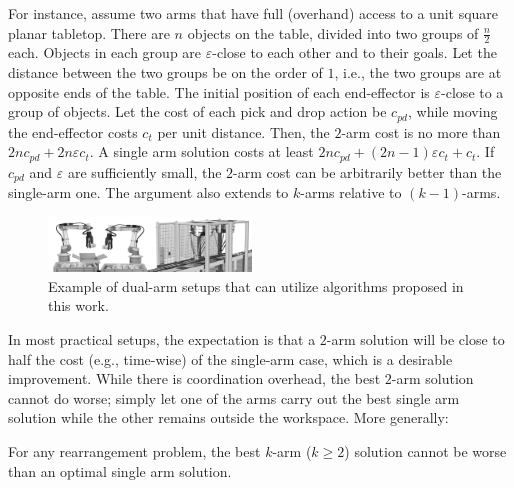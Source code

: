 For instance, assume two arms that have full (overhand) access to a 
unit square planar tabletop. There are $n$ objects on the table, 
divided into two groups of $\frac{n}{2}$ each. Objects in each group 
are $\varepsilon$-close to each other and to their goals. Let the 
distance between the two groups be on the order of $1$, i.e., the two 
groups are at opposite ends of the table. The initial position of each 
end-effector is $\varepsilon$-close to a group of objects. Let the cost 
of each pick and drop action be $c_{pd}$, while moving the 
end-effector costs $c_t$ per unit distance. Then, the $2$-arm 
cost is no more than $2nc_{pd} + 2n\varepsilon c_t $.  A single arm 
solution costs at least $2nc_{pd} + (2n-1)\varepsilon c_t + 
c_t$. If $c_{pd}$ and $\varepsilon$ are sufficiently small, the $2$-arm 
cost can be arbitrarily better than the single-arm one. The argument 
also extends to $k$-arms relative to $(k-1)$-arms.



\begin{figure}[t]
	\centering
	\includegraphics[width=0.48\textwidth]{figures/two_arms}
	\caption{Example of dual-arm setups that can utilize
	algorithms proposed in this work.}
	\label{fig:two_arms}
	\vspace{-0.25in}
\end{figure}



In most practical setups, the expectation is that a $2$-arm solution
will be close to half the cost (e.g., time-wise) of the single-arm 
case, which is a desirable improvement. While there 
is coordination overhead, the best $2$-arm solution cannot do worse; simply 
let one of the arms carry out the best single arm solution while the 
other remains outside the workspace. More generally:

\begin{observation}\label{l:2-arm-no-worse}
For any rearrangement problem, the best $k$-arm ($k \ge 2$) solution
cannot be worse than an optimal single arm solution.
\end{observation}

